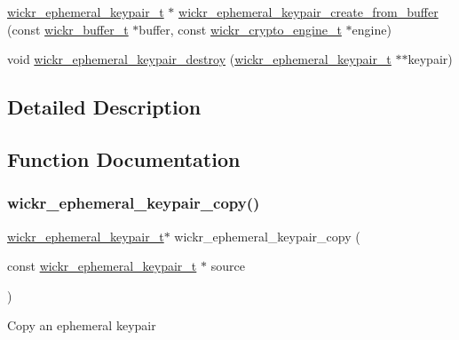\begin{DoxyCompactItemize}
\item 
\hyperlink{structwickr__ephemeral__keypair}{wickr\+\_\+ephemeral\+\_\+keypair\+\_\+t} $\ast$ \hyperlink{group__wickr__ephemeral__keypair_ga7ecd3769c68ba5bfbc95a225c1021ed0}{wickr\+\_\+ephemeral\+\_\+keypair\+\_\+create\+\_\+from\+\_\+buffer} (const \hyperlink{structwickr__buffer}{wickr\+\_\+buffer\+\_\+t} $\ast$buffer, const \hyperlink{structwickr__crypto__engine}{wickr\+\_\+crypto\+\_\+engine\+\_\+t} $\ast$engine)
\item 
void \hyperlink{group__wickr__ephemeral__keypair_gab77107c0b1a0d145c606817eeecec63d}{wickr\+\_\+ephemeral\+\_\+keypair\+\_\+destroy} (\hyperlink{structwickr__ephemeral__keypair}{wickr\+\_\+ephemeral\+\_\+keypair\+\_\+t} $\ast$$\ast$keypair)
\end{DoxyCompactItemize}


\subsection{Detailed Description}


\subsection{Function Documentation}
\mbox{\label{group__wickr__ephemeral__keypair_gacf14f050221091093b9a2948bd569662}} 
\subsubsection{\texorpdfstring{wickr\+\_\+ephemeral\+\_\+keypair\+\_\+copy()}{wickr\_ephemeral\_keypair\_copy()}}
{\footnotesize\ttfamily \hyperlink{structwickr__ephemeral__keypair}{wickr\+\_\+ephemeral\+\_\+keypair\+\_\+t}$\ast$ wickr\+\_\+ephemeral\+\_\+keypair\+\_\+copy (\begin{DoxyParamCaption}\item[{const \hyperlink{structwickr__ephemeral__keypair}{wickr\+\_\+ephemeral\+\_\+keypair\+\_\+t} $\ast$}]{source }\end{DoxyParamCaption})}

Copy an ephemeral keypair


